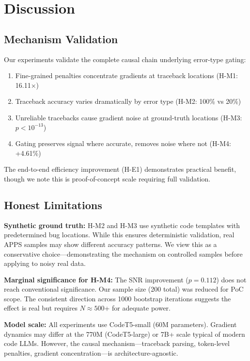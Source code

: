 \section{Discussion}

\subsection{Mechanism Validation}

Our experiments validate the complete causal chain underlying error-type gating:
\begin{enumerate}
\item Fine-grained penalties concentrate gradients at traceback locations (H-M1: 16.11$\times$)
\item Traceback accuracy varies dramatically by error type (H-M2: 100\% vs 20\%)
\item Unreliable tracebacks cause gradient noise at ground-truth locations (H-M3: $p<10^{-13}$)
\item Gating preserves signal where accurate, removes noise where not (H-M4: +4.61\%)
\end{enumerate}

The end-to-end efficiency improvement (H-E1) demonstrates practical benefit, though we note this is proof-of-concept scale requiring full validation.

\subsection{Honest Limitations}

\textbf{Synthetic ground truth:} H-M2 and H-M3 use synthetic code templates with predetermined bug locations. While this ensures deterministic validation, real APPS samples may show different accuracy patterns. We view this as a conservative choice---demonstrating the mechanism on controlled samples before applying to noisy real data.

\textbf{Marginal significance for H-M4:} The SNR improvement ($p=0.112$) does not reach conventional significance. Our sample size (200 total) was reduced for PoC scope. The consistent direction across 1000 bootstrap iterations suggests the effect is real but requires $N\approx500$+ for adequate power.

\textbf{Model scale:} All experiments use CodeT5-small (60M parameters). Gradient dynamics may differ at the 770M (CodeT5-large) or 7B+ scale typical of modern code LLMs. However, the causal mechanism---traceback parsing, token-level penalties, gradient concentration---is architecture-agnostic.

